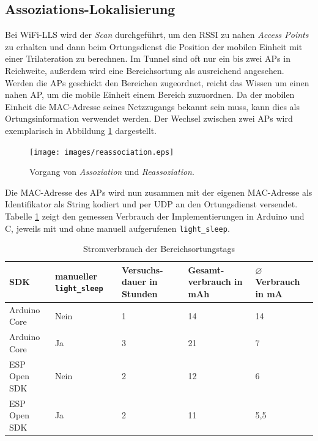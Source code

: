 \subsection{Assoziations-Lokalisierung}
\label{ch:phase1:sec:anpassungbereich}
Bei WiFi-LLS wird der \emph{Scan} durchgeführt, um den RSSI zu nahen \emph{Access Points} zu erhalten und dann beim Ortungsdienst die Position der mobilen Einheit mit einer Trilateration zu berechnen.
Im Tunnel sind oft nur ein bis zwei APs in Reichweite, außerdem wird eine Bereichsortung als ausreichend angesehen. \\
Werden die APs geschickt den Bereichen zugeordnet, reicht das Wissen um einen nahen AP, um die mobile Einheit einem Bereich zuzuordnen.
Da der mobilen Einheit die MAC-Adresse seines Netzzugangs bekannt sein muss, kann dies als Ortungsinformation verwendet werden.
Der Wechsel zwischen zwei APs wird exemplarisch in Abbildung \ref{fig:reassociation} dargestellt.

\begin{figure}[h!]
  \centering
	\texttt{[image: images/reassociation.eps]}
  \caption{Vorgang von \emph{Assoziation} und \emph{Reassoziation}.}
  \label{fig:reassociation}
\end{figure}

Die MAC-Adresse des APs wird nun zusammen mit der eigenen MAC-Adresse als Identifikator als String kodiert und per UDP an den Ortungsdienst versendet.\\
Tabelle \ref{table:naiveconsumption} zeigt den gemessen Verbrauch der Implementierungen in Arduino und C, jeweils mit und ohne manuell aufgerufenen \texttt{light\_sleep}.

\begin{table}[h]
	\centering
	\caption{Stromverbrauch der Bereichsortungstags}
	\label{table:naiveconsumption}
	\begin{tabular}{p{3cm}|p{2.2cm}|p{1.7cm}|p{2.5cm}|p{2.5cm}}
		SDK & manueller \texttt{light\_sleep} & Versuchs-dauer in Stunden & Gesamt-verbrauch in mAh & $\varnothing$ Verbrauch in mA \\
		\hline
		Arduino Core & Nein & 1 & 14 & 14 \\
		Arduino Core & Ja & 3 & 21 & 7 \\
		ESP Open SDK & Nein & 2 & 12 & 6 \\
		ESP Open SDK & Ja & 2 & 11 & 5,5 \\
	\end{tabular}
\end{table}

